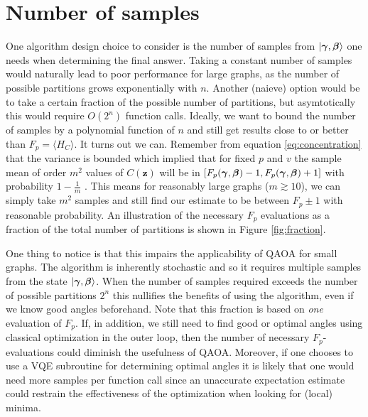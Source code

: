 \section{Number of samples}
One algorithm design choice to consider is the number of samples from $|\bm{\gamma},\bm{\beta}\rangle$ one needs when determining the final answer. Taking a constant number of samples would naturally lead to poor performance for large graphs, as the number of possible partitions grows exponentially with $n$. Another (naieve) option would be to take a certain fraction of the possible number of partitions, but asymtotically this would require $O(2^n)$ function calls. Ideally, we want to bound the number of samples by a polynomial function of $n$ and still get results close to or better than $F_p = \langle H_C \rangle$. It turns out we can. Remember from equation \eqref{eq:concentration} that the variance is bounded which implied that for fixed $p$ and $v$ the sample mean of order $m^2$ values of $C(\mathbf{z})$ will be in $[F_p(\bm{\gamma},\bm{\beta})-1,F_p(\bm{\gamma},\bm{\beta})+1]$ with probability $1 - \frac{1}{m}$ \cite{FGG14}. This means for reasonably large graphs ($m \gtrsim 10$), we can simply take $m^2$ samples and still find our estimate to be between $F_p \pm 1$ with reasonable probability. An illustration of the necessary $F_p$ evaluations as a fraction of the total number of partitions is shown in Figure \ref{fig:fraction}.

One thing to notice is that this impairs the applicability of QAOA for small graphs. The algorithm is inherently stochastic and so it requires multiple samples from the state $|\bm{\gamma},\bm{\beta}\rangle$. When the number of samples required exceeds the number of possible partitions $2^n$ this nullifies the benefits of using the algorithm, even if we know good angles beforehand. Note that this fraction is based on \emph{one} evaluation of $F_p$. If, in addition, we still need to find good or optimal angles using classical optimization in the outer loop, then the number of necessary $F_p$-evaluations could diminish the usefulness of QAOA. Moreover, if one chooses to use a VQE subroutine for determining optimal angles it is likely that one would need more samples per function call since an unaccurate expectation estimate could restrain the effectiveness of the optimization when looking for (local) minima.

